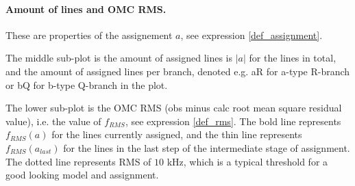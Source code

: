 \documentclass[11pt]{article}
\begin{document}
\paragraph{Amount of lines and OMC RMS.} These are properties of the assignement $a$, see expression \ref{def_assignment}.

    The middle sub-plot is the amount of assigned lines is $|a|$ for the lines in total, and the amount of assigned lines per branch, denoted e.g. aR for a-type R-branch or bQ for b-type Q-branch in the plot.
    
    The lower sub-plot is the OMC RMS (obs minus calc root mean square residual value), i.e. the value of $f_{RMS}$, see expression \ref{def_rms}. The bold line represents $f_{RMS}(a)$ for the lines currently assigned, and the thin line represents $f_{RMS}(a_{last})$ for the lines in the last step of the intermediate stage of assignment. The dotted line represents RMS of $10$ kHz, which is a typical threshold for a good looking model and assignment.
\end{document}
